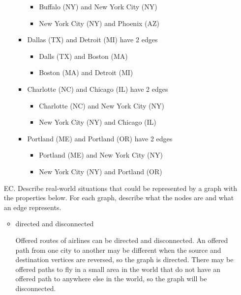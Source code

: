 \documentclass[10pt]{article}
\begin{document}
\begin{enumerate}
\begin{enumerate}
\begin{itemize}
						\vspace{0.5cm}
						\begin{itemize}
							\item Buffalo (NY) and New York City (NY)
							\item New York City (NY) and Phoenix (AZ)
						\end{itemize}
					\item Dallas (TX) and Detroit (MI) have 2 edges
						\begin{itemize}
							\item Dalls (TX) and Boston (MA)
							\item Boston (MA) and Detroit (MI)
						\end{itemize}
					\item Charlotte (NC) and Chicago (IL) have 2 edges
						\begin{itemize}
							\item Charlotte (NC) and New York City (NY)
							\item New York City (NY) and Chicago (IL)
						\end{itemize}
					\item Portland (ME) and Portland (OR) have 2 edges
						\begin{itemize}
							\item Portland (ME) and New York City (NY)
							\item New York City (NY) and Portland (OR)
						\end{itemize}
				\end{itemize}
		\end{enumerate}
	
	\item[EC.] Describe real-world situations that could be represented by a graph with the properties below. For each graph, describe what the nodes are and what an edge represents.
		\begin{itemize}
			\item directed and disconnected
			
				\vspace{0.5cm}
				Offered routes of airlines can be directed and disconnected. An offered path from one city to another may be different when the source and destination vertices are reversed, so the graph is directed. There may be offered paths to fly in a small area in the world that do not have an offered path to anywhere else in the world, so the graph will be disconnected.
				\vspace{0.5cm}
				

\end{itemize}
\end{enumerate}
\end{document}
